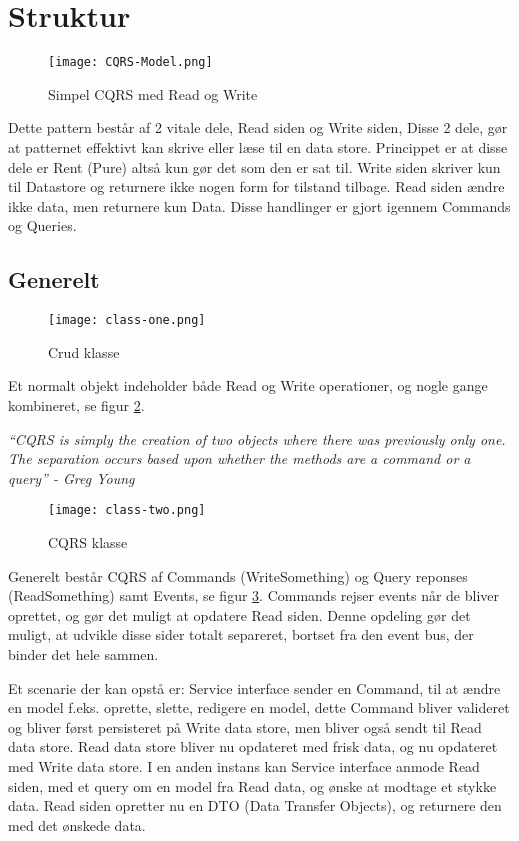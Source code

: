 \section{Struktur}

\begin{figure}[H]
	\center
	\texttt{[image: CQRS-Model.png]}
	\caption{Simpel CQRS med Read og Write}
	\label{fig:cqrs-model}
\end{figure}

Dette pattern består af 2 vitale dele, Read siden og Write siden, Disse 2 dele, gør at patternet effektivt kan skrive eller læse til en data store. Princippet er at disse dele er Rent (Pure) altså kun gør det som den er sat til. Write siden skriver kun til Datastore og returnere ikke nogen form for tilstand tilbage. Read siden ændre ikke data, men returnere kun Data. Disse handlinger er gjort igennem Commands og Queries.

\subsection{Generelt}

\begin{figure}[H]
	\center
	\texttt{[image: class-one.png]}
	\caption{Crud klasse}
	\label{fig:class-one}
\end{figure}

Et normalt objekt indeholder både Read og Write operationer, og nogle gange kombineret, se figur \ref{fig:class-one}.

\textit{``CQRS is simply the creation of two objects where there was previously only one. The separation occurs based upon whether the methods are a command or a query'' - Greg Young}

\begin{figure}[H]
	\center
	\texttt{[image: class-two.png]}
	\caption{CQRS klasse}
	\label{fig:class-two}
\end{figure}

Generelt består CQRS af Commands (WriteSomething) og Query reponses (ReadSomething) samt Events, se figur \ref{fig:class-two}. Commands rejser events når de bliver oprettet, og gør det muligt at opdatere Read siden. Denne opdeling gør det muligt, at udvikle disse sider totalt separeret, bortset fra den event bus, der binder det hele sammen.

Et scenarie der kan opstå er: Service interface sender en Command, til at ændre en model f.eks. oprette, slette, redigere en model, dette Command bliver valideret og bliver først persisteret på Write data store, men bliver også sendt til Read data store. Read data store bliver nu opdateret med frisk data, og nu opdateret med Write data store. I en anden instans kan Service interface anmode Read siden, med et query om en model fra Read data, og ønske at modtage et stykke data. Read siden opretter nu en DTO (Data Transfer Objects), og returnere den med det ønskede data.
